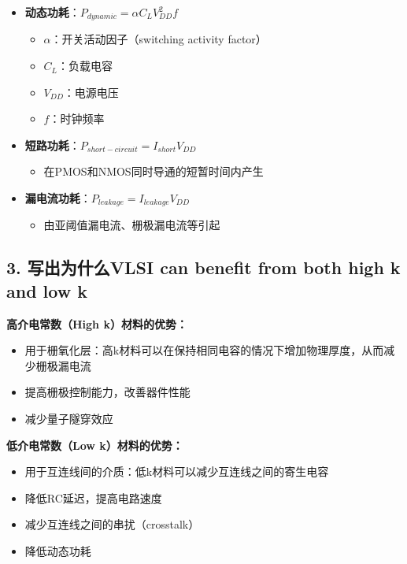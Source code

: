 \documentclass[UTF8,12pt,a4paper]{ctexart}
\begin{document}
\begin{itemize}
    \item \textbf{动态功耗}：$P_{dynamic} = \alpha C_L V_{DD}^2 f$
    \begin{itemize}
        \item $\alpha$：开关活动因子（switching activity factor）
        \item $C_L$：负载电容
        \item $V_{DD}$：电源电压
        \item $f$：时钟频率
    \end{itemize}
    
    \item \textbf{短路功耗}：$P_{short-circuit} = I_{short} V_{DD}$
    \begin{itemize}
        \item 在PMOS和NMOS同时导通的短暂时间内产生
    \end{itemize}
    
    \item \textbf{漏电流功耗}：$P_{leakage} = I_{leakage} V_{DD}$
    \begin{itemize}
        \item 由亚阈值漏电流、栅极漏电流等引起
    \end{itemize}
\end{itemize}

\subsection*{3. 写出为什么VLSI can benefit from both high k and low k}

\textbf{高介电常数（High k）材料的优势：}

\begin{itemize}
    \item 用于栅氧化层：高k材料可以在保持相同电容的情况下增加物理厚度，从而减少栅极漏电流
    \item 提高栅极控制能力，改善器件性能
    \item 减少量子隧穿效应
\end{itemize}

\textbf{低介电常数（Low k）材料的优势：}

\begin{itemize}
    \item 用于互连线间的介质：低k材料可以减少互连线之间的寄生电容
    \item 降低RC延迟，提高电路速度
    \item 减少互连线之间的串扰（crosstalk）
    \item 降低动态功耗
\end{itemize}
\end{document}
